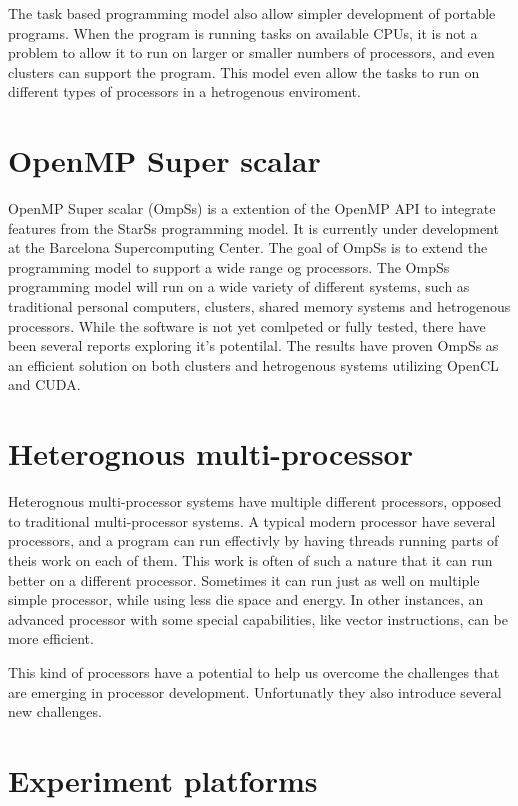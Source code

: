 The task based programming model also allow simpler development of portable programs.
When the program is running tasks on available CPUs, it is not a problem to allow it to run on larger or smaller numbers of processors, and even clusters can support the program.
This model even allow the tasks to run on different types of processors in a hetrogenous enviroment.

\section[OmpSs]{OpenMP Super scalar}
OpenMP Super scalar (OmpSs) is a extention of the OpenMP API to integrate features from the StarSs programming model.
It is currently under development at the Barcelona Supercomputing Center.
The goal of OmpSs is to extend the programming model to support a wide range og processors.
The OmpSs programming model will run on a wide variety of different systems, such as traditional personal computers, clusters, shared memory systems and hetrogenous processors.
While the software is not yet comlpeted or fully tested, there have been several reports exploring it's potentilal.
The results have proven OmpSs as an efficient solution on both clusters and hetrogenous systems utilizing OpenCL and CUDA.


\section{Heterognous multi-processor}
Heterognous multi-processor systems have multiple different processors, opposed to traditional multi-processor systems.
A typical modern processor have several processors, and a program can run effectivly by having threads running parts of theis work on each of them.
This work is often of such a nature that it can run better on a different processor.
Sometimes it can run just as well on multiple simple processor, while using less die space and energy.
In other instances, an advanced processor with some special capabilities, like vector instructions, can be more efficient.

  This kind of processors have a potential to help us overcome the challenges that are emerging in processor development.
    Unfortunatly they also introduce several new challenges.

\section{Experiment platforms}

